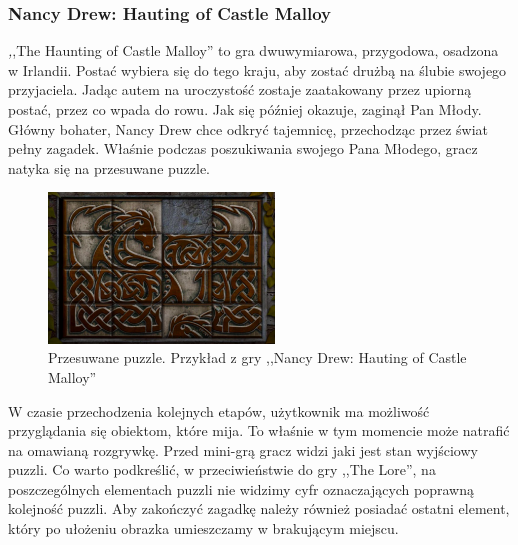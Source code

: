 \documentclass[oneside,polski,logo]{amuthesis}
\begin{document}
\subsubsection{Nancy Drew: Hauting of Castle Malloy}
\par \emph ,,The Haunting of Castle Malloy'' to gra dwuwymiarowa, przygodowa, osadzona w Irlandii. Postać wybiera się do tego kraju, aby zostać drużbą na ślubie swojego przyjaciela. Jadąc autem na uroczystość zostaje zaatakowany przez upiorną postać, przez co wpada do rowu. Jak się później okazuje, zaginął Pan Młody. Główny bohater, Nancy Drew chce odkryć tajemnicę, przechodząc przez świat pełny zagadek. Właśnie podczas poszukiwania swojego Pana Młodego, gracz natyka się na przesuwane puzzle. 
\begin{figure}[h]
	\centering
	\includegraphics[width=6cm]{images/tyrek/nd.png}
	\caption{Przesuwane puzzle. Przykład z gry ,,Nancy Drew: Hauting of Castle Malloy''}
\end{figure}

W czasie przechodzenia kolejnych etapów, użytkownik ma możliwość przyglądania się obiektom, które mija. To właśnie w tym momencie może natrafić na omawianą rozgrywkę. Przed mini-grą gracz widzi jaki jest stan wyjściowy puzzli. Co warto podkreślić, w przeciwieństwie do gry ,,The Lore'', na poszczególnych elementach puzzli nie widzimy cyfr oznaczających poprawną kolejność puzzli. Aby zakończyć zagadkę należy również posiadać ostatni element, który po ułożeniu obrazka umieszczamy w brakującym miejscu. \cite{nd}
\end{document}
